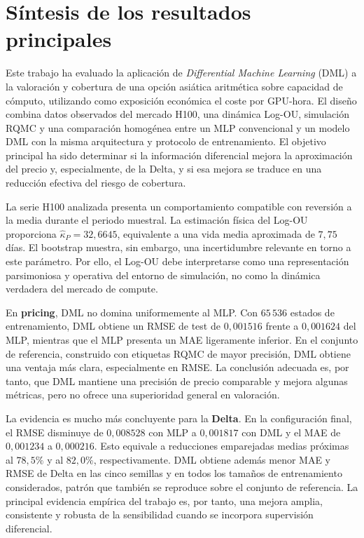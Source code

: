 \section{Síntesis de los resultados principales}
\label{sec:sintesis_conclusiones}

Este trabajo ha evaluado la aplicación de \emph{Differential Machine Learning} (DML) a la valoración y cobertura de una opción asiática aritmética sobre capacidad de cómputo, utilizando como exposición económica el coste por GPU-hora. El diseño combina datos observados del mercado H100, una dinámica Log-OU, simulación RQMC y una comparación homogénea entre un MLP convencional y un modelo DML con la misma arquitectura y protocolo de entrenamiento. El objetivo principal ha sido determinar si la información diferencial mejora la aproximación del precio y, especialmente, de la Delta, y si esa mejora se traduce en una reducción efectiva del riesgo de cobertura.

La serie H100 analizada presenta un comportamiento compatible con reversión a la media durante el periodo muestral. La estimación física del Log-OU proporciona $\widehat{\kappa}_P=32{,}6645$, equivalente a una vida media aproximada de $7{,}75$ días. El bootstrap muestra, sin embargo, una incertidumbre relevante en torno a este parámetro. Por ello, el Log-OU debe interpretarse como una representación parsimoniosa y operativa del entorno de simulación, no como la dinámica verdadera del mercado de compute.

En \textbf{pricing}, DML no domina uniformemente al MLP. Con $65\,536$ estados de entrenamiento, DML obtiene un RMSE de test de $0{,}001516$ frente a $0{,}001624$ del MLP, mientras que el MLP presenta un MAE ligeramente inferior. En el conjunto de referencia, construido con etiquetas RQMC de mayor precisión, DML obtiene una ventaja más clara, especialmente en RMSE. La conclusión adecuada es, por tanto, que DML mantiene una precisión de precio comparable y mejora algunas métricas, pero no ofrece una superioridad general en valoración.

La evidencia es mucho más concluyente para la \textbf{Delta}. En la configuración final, el RMSE disminuye de $0{,}008528$ con MLP a $0{,}001817$ con DML y el MAE de $0{,}001234$ a $0{,}000216$. Esto equivale a reducciones emparejadas medias próximas al $78{,}5\%$ y al $82{,}0\%$, respectivamente. DML obtiene además menor MAE y RMSE de Delta en las cinco semillas y en todos los tamaños de entrenamiento considerados, patrón que también se reproduce sobre el conjunto de referencia. La principal evidencia empírica del trabajo es, por tanto, una mejora amplia, consistente y robusta de la sensibilidad cuando se incorpora supervisión diferencial.

